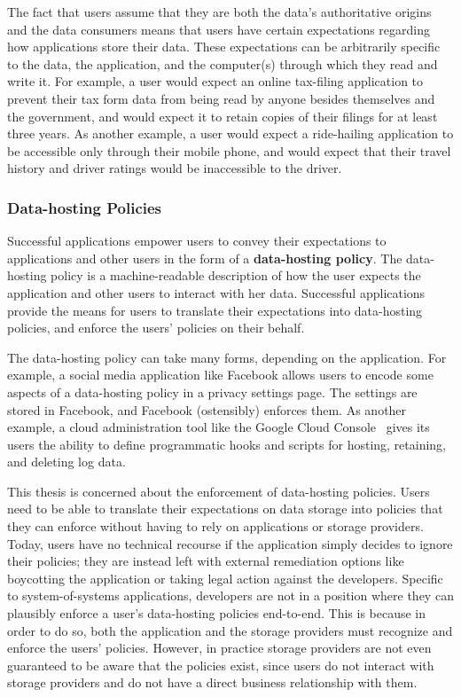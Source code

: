 The fact that users assume that they are both
the data's authoritative origins and the data consumers
means that users have certain expectations regarding how applications store
their data.  These expectations can be arbitrarily specific to the data, the application, and the
computer(s) through which they read and write it.  For example, a user would
expect an online tax-filing application to prevent their tax form data from being read by anyone
besides themselves and the government, and would expect it to retain copies of their 
filings for at least three years.  As another example, a user would expect a
ride-hailing application to be accessible only through their mobile phone, and
would expect that their travel history and driver ratings would be inaccessible
to the driver.

\subsubsection{Data-hosting Policies}

Successful applications empower users to convey their expectations to
applications and other users in the form of a \textbf{data-hosting policy}.
The data-hosting policy is a machine-readable
description of how the user expects the application and other users to interact
with her data.  Successful applications provide the means for users to translate their
expectations into data-hosting policies, and enforce the users'
policies on their behalf.

The data-hosting policy can take many forms, depending on the application.
For example, a social media application like Facebook allows
users to encode some aspects of a data-hosting policy in a privacy settings page.
The settings are stored in Facebook, and Facebook (ostensibly) enforces them.
As another example, a cloud administration tool like the Google Cloud
Console~\cite{google-cloud} gives its users the ability to define programmatic
hooks and scripts for hosting, retaining, and deleting log data.

This thesis is concerned about the enforcement of data-hosting policies.
Users need to be able to translate their expectations on data storage into
policies that they can enforce without having to rely on applications or storage
providers.  Today, users have no technical recourse if the application
simply decides to ignore their policies; they are instead left with external
remediation options like boycotting the application or taking legal action
against the developers.  Specific to system-of-systems applications,
developers are not in a position where they can plausibly enforce a user's data-hosting
policies end-to-end.  This is because in order to do so, 
both the application and the storage
providers must recognize and enforce the users' policies.  However, in practice storage
providers are not even guaranteed to be aware that the policies exist,
since users do not interact with storage providers and do not have a direct business
relationship with them.

